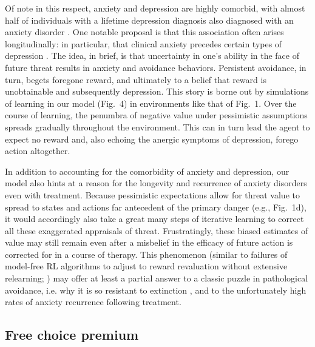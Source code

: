 \documentclass[11pt]{article} %
\begin{document}
Of note in this respect, anxiety and depression are highly comorbid, with almost half of individuals with a lifetime depression diagnosis also diagnosed with an anxiety disorder \citep{kessler2015}. One notable proposal is that this association often arises longitudinally: in particular, that clinical anxiety precedes certain types of depression \citep{alloy1990, jacobson2014}. The idea, in brief, is that uncertainty in one's ability in the face of future threat results in anxiety and avoidance behaviors. Persistent avoidance, in turn, begets foregone reward, and ultimately to a belief that reward is unobtainable and subsequently depression. This story is borne out by simulations of learning in our model (Fig.~4) in environments like that of Fig.~1. Over the course of learning, the penumbra of negative value under pessimistic assumptions spreads gradually throughout the environment. This can in turn lead the agent to expect no reward and, also echoing the anergic symptoms of depression, forego action altogether.

In addition to accounting for the comorbidity of anxiety and depression, our model also hints at a reason for the longevity and recurrence of anxiety disorders even with treatment. Because pessimistic expectations allow for threat value to spread to states and actions far antecedent of the primary danger (e.g., Fig.~1d), it would accordingly also take a great many steps of iterative learning to correct all these exaggerated appraisals of threat. Frustratingly, these biased estimates of value may still remain even after a misbelief in the efficacy of future action is corrected for in a course of therapy. This phenomenon (similar to failures of model-free RL algorithms to adjust to reward revaluation without extensive relearning; \cite{daw2005}) may offer at least a partial answer to a classic puzzle in pathological avoidance, i.e. why it is so resistant to extinction \cite{moutoussis2018}, and to the unfortunately high rates of anxiety recurrence following treatment\citep{pittig2018}.

\subsection{Free choice premium}
\end{document}
